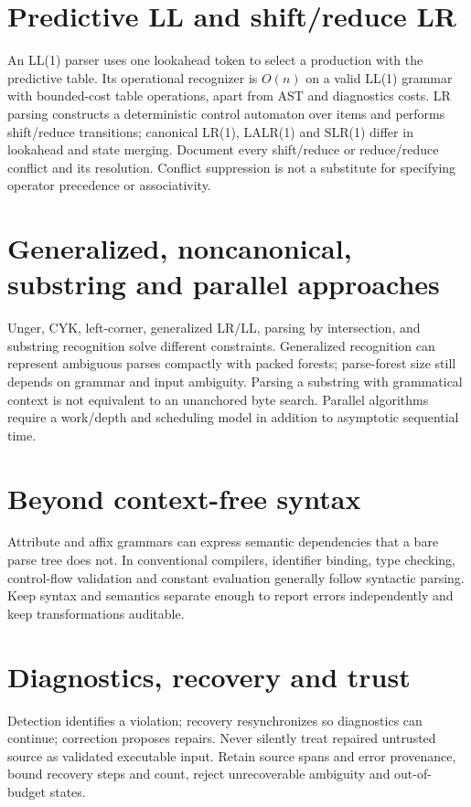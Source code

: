 \documentclass[11pt,letterpaper]{article}
\begin{document}
\section{Predictive LL and shift/reduce LR}
An LL(1) parser uses one lookahead token to select a production with the predictive table. Its operational recognizer is $O(n)$ on a valid LL(1) grammar with bounded-cost table operations, apart from AST and diagnostics costs. LR parsing constructs a deterministic control automaton over items and performs shift/reduce transitions; canonical LR(1), LALR(1) and SLR(1) differ in lookahead and state merging. Document every shift/reduce or reduce/reduce conflict and its resolution. Conflict suppression is not a substitute for specifying operator precedence or associativity.
\section{Generalized, noncanonical, substring and parallel approaches}
Unger, CYK, left-corner, generalized LR/LL, parsing by intersection, and substring recognition solve different constraints. Generalized recognition can represent ambiguous parses compactly with packed forests; parse-forest size still depends on grammar and input ambiguity. Parsing a substring with grammatical context is not equivalent to an unanchored byte search. Parallel algorithms require a work/depth and scheduling model in addition to asymptotic sequential time.
\section{Beyond context-free syntax}
Attribute and affix grammars can express semantic dependencies that a bare parse tree does not. In conventional compilers, identifier binding, type checking, control-flow validation and constant evaluation generally follow syntactic parsing. Keep syntax and semantics separate enough to report errors independently and keep transformations auditable.
\section{Diagnostics, recovery and trust}
Detection identifies a violation; recovery resynchronizes so diagnostics can continue; correction proposes repairs. Never silently treat repaired untrusted source as validated executable input. Retain source spans and error provenance, bound recovery steps and count, reject unrecoverable ambiguity and out-of-budget states.
\end{document}

